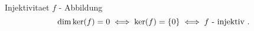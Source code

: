 \documentclass[class=article, crop=false]{standalone}
\begin{document}
\begin{zettel}{Injektivitaet}
    $f$ - Abbildung
\[
    \dim\ker(f) = 0 \iff \ker (f) = \set{0} \iff f \text{ - injektiv }
.\]

\end{zettel}
\end{document}
